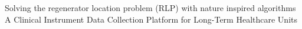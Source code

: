 %
%
%

\vspace{0.5em}
\begin{scholarship}
					{Solving the regenerator location problem (RLP) with nature inspired algorithms}
					{A Clinical Instrument Data Collection Platform for Long-Term Healthcare Units}
\end{scholarship}